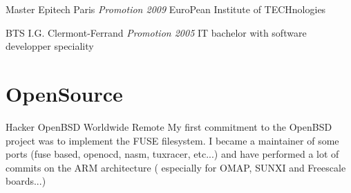 \documentclass[11pt,a4paper,sans]{moderncv}
\begin{document}
{Master}
{Epitech}
{Paris}
{\textit{Promotion 2009}}
{EuroPean Institute of TECHnologies}

{BTS}
{I.G.}
{Clermont-Ferrand}
{\textit{Promotion 2005}}
{IT bachelor with software developper speciality}

\section{OpenSource}

{Hacker}
{OpenBSD}
{Worldwide Remote}
{}
{My first commitment to the OpenBSD project was to implement the FUSE filesystem.\newline{}
I became a maintainer of some ports (fuse based, openocd, nasm, tuxracer, etc...) and have 
performed a lot of commits on the ARM architecture ( especially for OMAP, SUNXI and 
Freescale boards...) 
}
\end{document}
